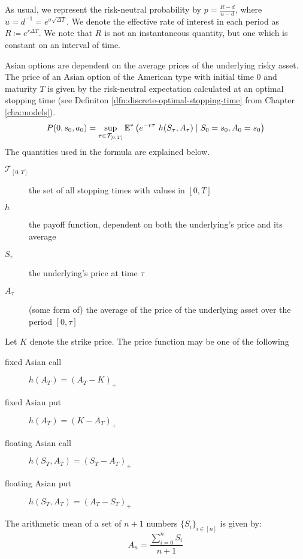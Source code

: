 As usual, we represent the risk-neutral probability by $ p = \frac{R - d}{u - d} $, where $ u = d^{-1} = e^{\sigma \sqrt{\Delta T}} $. We denote the effective rate of interest in each period as $ R \coloneqq e^{r \Delta T} $. We note that $R$ is not an instantaneous quantity, but one which is constant on an interval of time.

Asian options are dependent on the average prices of the underlying risky asset. The price of an Asian option of the American type with initial time $ 0 $ and maturity $ T $ is given by the risk-neutral expectation calculated at an optimal stopping time (see Definiton \ref{dfn:discrete-optimal-stopping-time} from Chapter \ref{cha:models}).
\begin{equation}
	P(0, s_0, a_0) = \sup_{\tau \in \mathcal{T}_{[0,T]}}  \operatorname{\mathbb{E}}^* \left(  e^{-r \tau} \  h(S_{\tau}, A_{\tau})  \mid  S_0 = s_0, A_0 = s_0  \right)
\end{equation}
The quantities used in the formula are explained below.
\begin{description}
	\item[$ \mathcal{T}_{[0,T]} $] the set of all stopping times with values in $ [0, T ] $
	\item[$ h $] the payoff function, dependent on both the underlying's price and its average
	\item[$ S_{\tau} $] the underlying's price at time $ \tau $
	\item[$ A_{\tau} $] (some form of) the average of the price of the underlying asset over the period $ [0, \tau] $
\end{description}

Let $ K $ denote the strike price. The price function may be one of the following
\begin{description}
	\item[fixed Asian call] $ h(A_T) = (A_T - K)_+ $
	\item[fixed Asian put] $ h(A_T) = (K - A_T)_+ $
	\item[floating Asian call] $ h(S_T, A_T) = (S_T - A_T)_+ $
	\item[floating Asian put] $ h(S_T, A_T) = (A_T - S_T)_+ $
\end{description}


\begin{dfn}
	The arithmetic mean of a set of $ n+1 $ numbers $ \{ S_i \}_{i \in [n]} $ is given by:
	\begin{equation}
	\label{eq:am}
	A_{n} = \frac{\sum_{i=0}^n S_i}{n+1}
	\end{equation}
\end{dfn}

